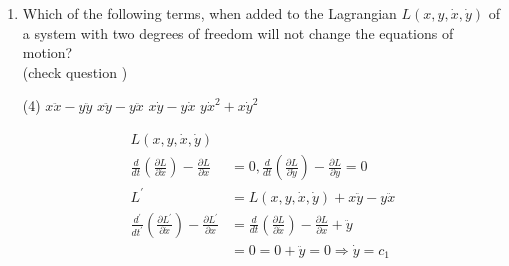 \begin{enumerate}
\begin{answer}
\begin{align*}
	\left(m_{1}+m_{2}\right) \ddot{r}-m_{1} r \dot{\theta}^{2}+m_{2} g&=0
	\intertext{Hence angular momentum is conserved}
	m_{1} r^{2} \dot{\theta}&=m_{1} r_{0}^{2} \dot{\theta}_{0} \Rightarrow \dot{\theta}=\frac{r_{0}^{2} \dot{\theta}_{0}}{r^{2}}\\
	\text{For circular motion }&m r_{0} \dot{\theta}_{0}^{2}=m_{2} g\\
	\text{	so }r \dot{\theta}^{2}&=\frac{m_{2}}{m_{1}}\left(\frac{r_{0}}{r}\right)^{3} g\\
	\left(m_{1}+m_{2}\right) \ddot{r}-m_{2}\left(\frac{r_{0}}{r}\right)^{3} g+m_{2} g&=0\\
	\text{Put }r&=r_{0}+\in \ddot{r}=\ddot{\epsilon}\\
	\intertext{$\left(m_{1}+m_{2}\right) \ddot{\in}-m_{2}\left(\frac{r_{0}}{r_{0}+\epsilon}\right)^{3} g+m_{2} g\Rightarrow\left(m_{1}+m_{2}\right) \ddot{\in}-m_{2} r_{0}^{3}\left(r_{0}+\epsilon\right)^{-3} g+m_{2} g$}\\
	\left(m_{1}+m_{2}\right) \ddot{\star}-m_{2} r_{0}^{3} g r_{0}^{-3}\left(1+\frac{\epsilon}{r_{0}}\right)^{-3}+m_{2} g&=0\\
	\left(m_{1}+m_{2}\right) \ddot+\frac{m_{2} 3 \epsilon}{r_{0}}&=0 \Rightarrow \omega=\sqrt{\frac{3 m_{2} g}{\left(m_{1}+m_{2}\right) r_{0}}}
	\end{align*}
	So the correct answer is \textbf{Option (D)}
\end{answer}	
	\item Which of the following terms, when added to the Lagrangian $L(x, y, \dot{x}, \dot{y})$ of a system with two degrees of freedom will not change the equations of motion?\\
	(check question )
	{}
	\begin{tasks}(4)
		\task[\textbf{A.}] $x \ddot{x}-y \ddot{y}$
		\task[\textbf{B.}] $x \ddot{y}-y \ddot{x}$
		\task[\textbf{C.}] $x \dot{y}-y \dot{x}$
		\task[\textbf{D.}] $y \dot{x}^{2}+x \dot{y}^{2}$ 
	\end{tasks}
\begin{answer}
	\begin{align*}
	L(x, y, \dot{x}, \dot{y})\\
	\frac{d}{d t}\left(\frac{\partial L}{\partial \dot{x}}\right)-\frac{\partial L}{\partial x}&=0, \frac{d}{d t}\left(\frac{\partial L}{\partial \dot{y}}\right)-\frac{\partial L}{\partial y}=0\\
	L^{\prime}&=L(x, y, \dot{x}, \dot{y})+x \ddot{y}-y \ddot{x}\\
	\frac{d^{\prime}}{d t^{\prime}}\left(\frac{\partial L^{\prime}}{\partial \dot{x}}\right)-\frac{\partial L^{\prime}}{\partial x}&=\frac{d}{d t}\left(\frac{\partial L}{\partial \dot{x}}\right)-\frac{\partial L}{\partial x}+\ddot{y}\\&=0=0+\ddot{y}=0 \Rightarrow \dot{y}=c_{1}\\

\end{align*}
\end{answer}
\end{enumerate}

